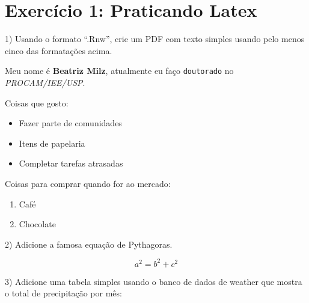 \documentclass{article}\usepackage[]{graphicx}\usepackage[]{color}
\begin{document}
\section*{Exercício 1: Praticando Latex}


1) Usando o formato “.Rnw”, crie um PDF com texto simples usando pelo menos cinco das formatações acima.\hfill\break

Meu nome é \textbf{Beatriz Milz}, atualmente eu faço \texttt{doutorado} no \emph{PROCAM/IEE/USP}. \break


Coisas que gosto:

\begin{itemize}
  \item Fazer parte de comunidades
  \item Itens de papelaria
  \item Completar tarefas atrasadas
\end{itemize}


Coisas para comprar quando for ao mercado:

\begin{enumerate}
  \item Café
  \item Chocolate
\end{enumerate}


2) Adicione a famosa equação de Pythagoras.

$$a^{2} = b^{2} + c^{2} $$

3) Adicione uma tabela simples usando o banco de dados de weather que mostra o total de precipitação por mês:
\end{document}
